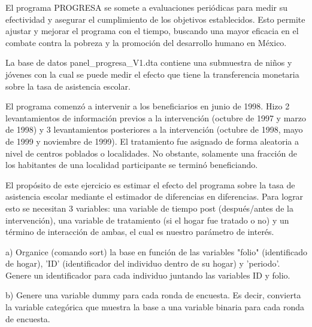 \documentclass[12pt]{article}
\begin{document}
\vspace{0.5cm}

El programa PROGRESA se somete a evaluaciones periódicas para medir su efectividad y asegurar el cumplimiento de los objetivos establecidos. Esto permite ajustar y mejorar el programa con el tiempo, buscando una mayor eficacia en el combate contra la pobreza y la promoción del desarrollo humano en México. 

\vspace{0.5cm}

La base de datos panel\_progresa\_V1.dta contiene una submuestra de niños y jóvenes con la cual se puede medir el efecto que tiene la transferencia monetaria sobre la tasa de asistencia escolar. 

\vspace{0.5cm}

El programa comenzó a intervenir a los beneficiarios en junio de 1998. Hizo 2 levantamientos de información previos a la intervención (octubre de 1997 y marzo de 1998) y 3 levantamientos posteriores a la intervención (octubre de 1998, mayo de 1999 y noviembre de 1999). El tratamiento fue asignado de forma aleatoria a nivel de
centros poblados o localidades. No obstante, solamente una fracción de los habitantes de una localidad participante se terminó beneficiando. 

\vspace{0.5cm}
El propósito de este ejercicio es estimar el efecto del programa sobre la tasa de asistencia escolar mediante el estimador de diferencias en diferencias. Para lograr esto se necesitan 3 variables: una variable de tiempo post (después/antes de la intervención), una variable de tratamiento (si el hogar fue tratado o no) y un término de interacción de ambas, el cual es nuestro parámetro de interés. 

\vspace{0.5cm}

a) Organice (comando sort) la base en función de las variables "folio" (identificado de hogar), 'ID' (identificador del individuo dentro de su hogar) y 'periodo'. Genere un identificador para cada individuo juntando las variables ID y folio. 
\begin{stlog}\end{stlog}

\vspace{0.5cm}
b) Genere una variable dummy para cada ronda de encuesta. Es decir, convierta la variable categórica que muestra la base a una variable binaria para cada ronda de encuesta. 
\end{document}
